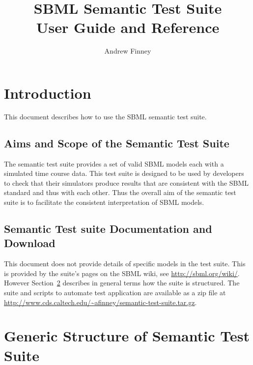 \documentclass{cekarticle}
\begin{document}

\title{SBML Semantic Test Suite\\User Guide and Reference}

\author{Andrew Finney}


\maketitlepage

\section{Introduction}
\label{sec:introduction}

This document describes how to use the SBML semantic test suite.

\subsection{Aims and Scope of the Semantic Test Suite}

The semantic test suite provides a set of valid SBML models each
with a simulated time course data.  This test suite is designed to
be used by developers to check that their simulators produce
results that are consistent with the SBML standard and thus with
each other.  Thus the overall aim of the semantic test suite is to
facilitate the consistent interpretation of SBML models.

\subsection{Semantic Test suite Documentation and Download}

This document does not provide details of specific models in the
test suite. This is provided by the suite's pages on the SBML
wiki, see \url{http://sbml.org/wiki/}. However
Section~\ref{sec:structure} describes in general terms how the
suite is structured.  The suite and scripts to automate test
application are available as a zip file at
\url{http://www.cds.caltech.edu/~afinney/semantic-test-suite.tar.gz}.

\section{Generic Structure of Semantic Test Suite}
\label{sec:structure}
\end{document}
